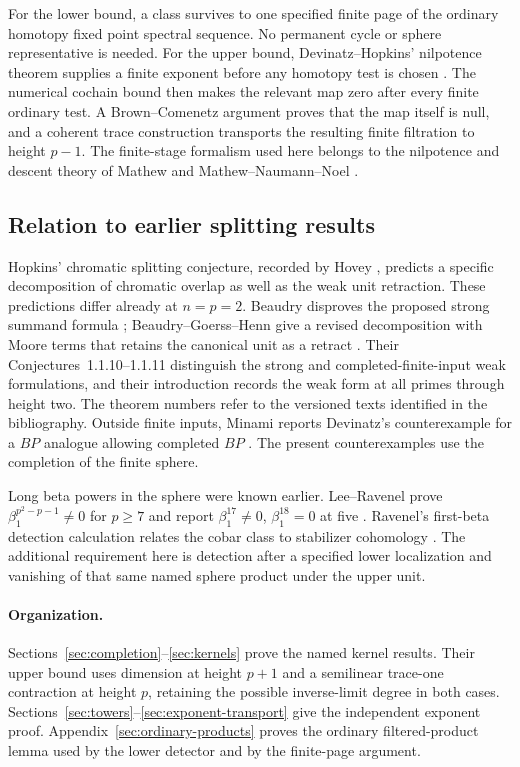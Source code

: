 For the lower bound, a class survives to one specified finite page of
the ordinary homotopy fixed point spectral sequence. No permanent
cycle or sphere representative is needed. For the upper bound,
Devinatz--Hopkins' nilpotence theorem supplies a finite exponent before
any homotopy test is chosen \cite[Appendix~A, Proposition~A.3]{dh2004}.
The numerical cochain bound then makes the relevant map zero after
every finite ordinary test. A Brown--Comenetz argument proves that
the map itself is null, and a coherent trace construction transports
the resulting finite filtration to height $p-1$. The finite-stage
formalism used here belongs to the nilpotence and descent theory of
Mathew and Mathew--Naumann--Noel
\cite{mathew2016,mnn2017,mnn2019}.

\subsection{Relation to earlier splitting results}

Hopkins' chromatic splitting conjecture, recorded by Hovey
\cite[Conjecture~4.2, especially part~(v)]{hovey1995}, predicts a
specific decomposition of chromatic overlap as well as the weak unit
retraction. These predictions differ already at $n=p=2$.
Beaudry disproves the proposed strong summand formula
\cite[Theorem~1.0.4]{beaudry2017}; Beaudry--Goerss--Henn give a revised
decomposition with Moore terms that retains the canonical unit as a
retract \cite[Theorem~1.1.6]{bgh2022}. Their
Conjectures~1.1.10--1.1.11 distinguish the strong and
completed-finite-input weak formulations, and their introduction
records the weak form at all primes through height two. The theorem
numbers refer to the versioned texts identified in the bibliography.
Outside finite inputs, Minami reports Devinatz's counterexample for
a $BP$ analogue allowing completed $BP$
\cite[Introduction and Remark~1.1]{minami2003}. The present
counterexamples use the completion of the finite sphere.

Long beta powers in the sphere were known earlier. Lee--Ravenel prove
$\beta_1^{p^2-p-1}\ne0$ for $p\geq7$ and report
$\beta_1^{17}\ne0$, $\beta_1^{18}=0$ at five
\cite[opening theorem and introduction]{lee-ravenel1994}.
Ravenel's first-beta detection calculation relates the cobar class to
stabilizer cohomology \cite[Theorem~4 and its proof in Section~2]{ravenel1978}.
The additional requirement here is detection after a specified lower
localization and vanishing of that same named sphere product under
the upper unit.

\paragraph{Organization.}
Sections~\ref{sec:completion}--\ref{sec:kernels} prove the named
kernel results. Their upper bound uses dimension at height $p+1$
and a semilinear trace-one contraction at height $p$, retaining the
possible inverse-limit degree in both cases.
Sections~\ref{sec:towers}--\ref{sec:exponent-transport} give the
independent exponent proof. Appendix~\ref{sec:ordinary-products}
proves the ordinary filtered-product lemma used by the lower detector
and by the finite-page argument.
